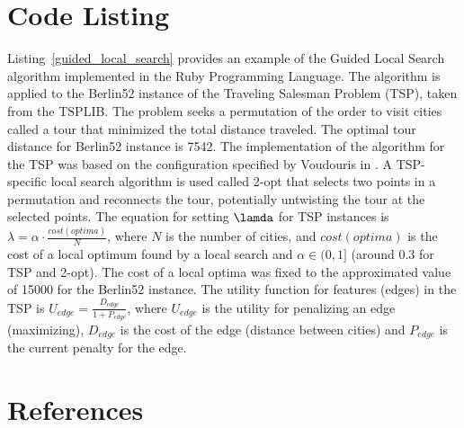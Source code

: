 \documentclass[a4paper, 11pt]{article}
\begin{document}
\section{Code Listing}
\label{sec:code}
Listing~\ref{guided_local_search} provides an example of the Guided Local Search algorithm implemented in the Ruby Programming Language. 
The algorithm is applied to the Berlin52 instance of the Traveling Salesman Problem (TSP), taken from the TSPLIB. The problem seeks a permutation of the order to visit cities called a tour that minimized the total distance traveled. The optimal tour distance for Berlin52 instance is 7542.
The implementation of the algorithm for the TSP was based on the configuration specified by Voudouris in \cite{Voudouris1997}.
A TSP-specific local search algorithm is used called 2-opt that selects two points in a permutation and reconnects the tour, potentially untwisting the tour at the selected points.
The equation for setting $\lamda$ for TSP instances is $\lambda = \alpha\cdot\frac{cost(optima)}{N}$, where $N$ is the number of cities, and $cost(optima)$ is the cost of a local optimum found by a local search and $\alpha\in (0,1]$ (around 0.3 for TSP and 2-opt). The cost of a local optima was fixed to the approximated value of 15000 for the Berlin52 instance. 
The utility function for features (edges) in the TSP is $U_{edge}=\frac{D_{edge}}{1+P_{edge}}$, where $U_{edge}$ is the utility for penalizing an edge (maximizing), $D_{edge}$ is the cost of the edge (distance between cities) and $P_{edge}$ is the current penalty for the edge.




\section{References}
\label{sec:references}
\end{document}
